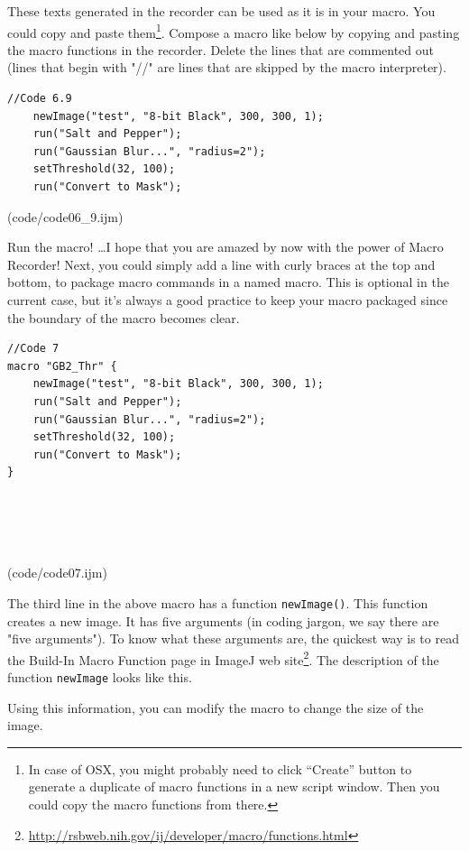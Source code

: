 \documentclass[11pt,a4paper,oneside]{report}
\newenvironment{indentCom}
{\begin{list}{}
         {\setlength{\leftmargin}{1em}}
         \item[]
}
{\end{list}}
\newcommand{\ilcom}[1]{\texttt{\small#1}}
\begin{document}
These texts generated in the recorder can be used as it is in your macro.  You could copy and paste them\footnote{In case of OSX, you might probably need to click ``Create'' button to generate a duplicate of macro functions in a new script window. Then you could copy the macro functions from there.}. Compose a macro like below by copying and pasting the macro functions in the recorder.  Delete the lines that are commented out (lines that begin with "//" are lines that are skipped by the macro interpreter).

\begin{lstlisting}
//Code 6.9
	newImage("test", "8-bit Black", 300, 300, 1);
	run("Salt and Pepper");
	run("Gaussian Blur...", "radius=2");
	setThreshold(32, 100);
	run("Convert to Mask");
\end{lstlisting}
(code/code06_9.ijm)

Run the macro! \ldots I hope that you are amazed by now with the power of Macro
Recorder! Next, you could simply add a line with curly braces at the top and bottom, to package macro commands in a named macro. This is optional in the current case, but it's always a good practice to keep your macro packaged since the boundary of the macro becomes clear. 
 

\begin{lstlisting}
//Code 7
macro "GB2_Thr" {
	newImage("test", "8-bit Black", 300, 300, 1);
	run("Salt and Pepper");
	run("Gaussian Blur...", "radius=2");
	setThreshold(32, 100);
	run("Convert to Mask");
}





\end{lstlisting}
(code/code07.ijm)

The third line in the above macro has a function \ilcom{newImage()}. This
function creates a new image. It has five arguments (in coding jargon, we say
there are "five arguments"). To know what these arguments are, 
the quickest way is to read the Build-In Macro Function page in ImageJ web site\footnote{\url{http://rsbweb.nih.gov/ij/developer/macro/functions.html}}.  
The description of the function \ilcom{newImage} looks like this. 

\begin{indentCom}

\end{indentCom}
Using this information, you can modify the macro to change the size of the image.
\end{document}
